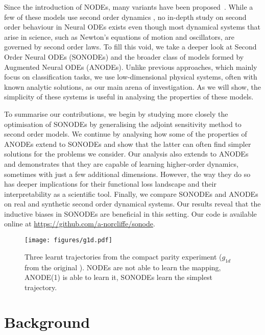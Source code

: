 \documentclass{article}
\theoremstyle{remark}
\theoremstyle{definition}
\begin{document}
Since the introduction of NODEs, many variants have been proposed~\citep{jia2019neural, Tzen2019NeuralSD, dupont2019augmented, Zhang2019ANODEV2AC, yldz2019ode2vae, poli2019graph, massaroli2020dissecting}. While a few of these models use second order dynamics \citep{yldz2019ode2vae, poli2019graph, massaroli2020dissecting}, no in-depth study on second order behaviour in Neural ODEs exists even though most dynamical systems that arise in science, such as Newton's equations of motion and oscillators, are governed by second order laws. To fill this void, we take a deeper look at Second Order Neural ODEs (SONODEs) and the broader class of models formed by Augmented Neural ODEs (ANODEs). Unlike previous approaches, which mainly focus on classification tasks, we use low-dimensional physical systems, often with known analytic solutions, as our main arena of investigation. As we will show, the simplicity of these systems is useful in analysing the properties of these models.

To summarise our contributions, we begin by studying more closely the optimisation of SONODEs by generalising the adjoint sensitivity method to second order models. We continue by analysing how some of the properties of ANODEs extend to SONODEs and show that the latter can often find simpler solutions for the problems we consider. Our analysis also extends to ANODEs and demonstrates that they are capable of learning higher-order dynamics, sometimes with just a few additional dimensions. However, the way they do so has deeper implications for their functional loss landscape and their interpretability as a scientific tool. Finally, we compare SONODEs and ANODEs on real and synthetic second order dynamical systems. Our results reveal that the inductive biases in SONODEs are beneficial in this setting. Our code is available online at \url{https://github.com/a-norcliffe/sonode}.

\begin{figure}[t]
    \centering
    \texttt{[image: figures/g1d.pdf]}
    \vskip -0.1in
    \caption{Three learnt trajectories from the compact parity experiment ($g_{1d}$ from the original \citep{dupont2019augmented}). NODEs are not able to learn the mapping, ANODE(1) is able to learn it, SONODEs learn the simplest trajectory.}\label{fig: g1d}
\end{figure}

\section{Background}
\end{document}
